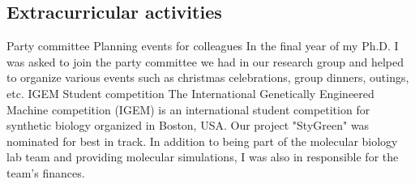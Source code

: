 \documentclass[letterpaper]{twentysecondcv} %
\begin{document}

\newpage %

\makeprofile %

\subsection{Extracurricular activities}

\begin{twenty}
		{Party committee}
		{Planning events for colleagues}
		{In the final year of my Ph.D. I was asked to join the party committee we had in our research group and helped to organize various events such as christmas celebrations, group dinners, outings, etc.}
		{IGEM}
		{Student competition}
		{The International Genetically Engineered Machine competition (IGEM) is an international student competition for synthetic biology organized in Boston, USA. Our project "StyGreen" was nominated for best in track. In addition to being part of the molecular biology lab team and providing molecular simulations, I was also in responsible for the team's finances.}
\end{twenty}
		
		
\end{document}
